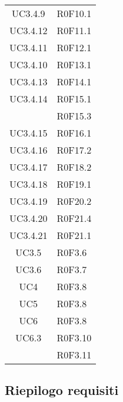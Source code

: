 \begin{center}
\begin{longtable}{ c m{4cm} }
	\rowcolor{white}UC3.4.9 & R0F10.1\\
	\rowcolor{tableRow}UC3.4.12 & R0F11.1\\
	\rowcolor{white}UC3.4.11 & R0F12.1\\
	\rowcolor{tableRow}UC3.4.10 & R0F13.1\\
	\rowcolor{white}UC3.4.13 & R0F14.1\\
	\rowcolor{tableRow}UC3.4.14 & R0F15.1\\
	\rowcolor{tableRow}& R0F15.3\\
	\rowcolor{white}UC3.4.15 & R0F16.1\\
	\rowcolor{tableRow}UC3.4.16 & R0F17.2\\
	\rowcolor{white}UC3.4.17 & R0F18.2\\
	\rowcolor{tableRow}UC3.4.18 & R0F19.1\\
	\rowcolor{white}UC3.4.19 & R0F20.2\\
	\rowcolor{tableRow}UC3.4.20 & R0F21.4\\
	\rowcolor{white}UC3.4.21 & R0F21.1\\
	\rowcolor{tableRow}UC3.5 & R0F3.6\\
	\rowcolor{white}UC3.6 & R0F3.7\\
	\rowcolor{tableRow}UC4 & R0F3.8\\
	\rowcolor{white}UC5 & R0F3.8\\
	\rowcolor{tableRow}UC6 & R0F3.8\\
	\rowcolor{white}UC6.3 & R0F3.10\\
	\rowcolor{white}& R0F3.11\\
        
    \end{longtable}
    
\end{center}

\subsection{Riepilogo requisiti}

